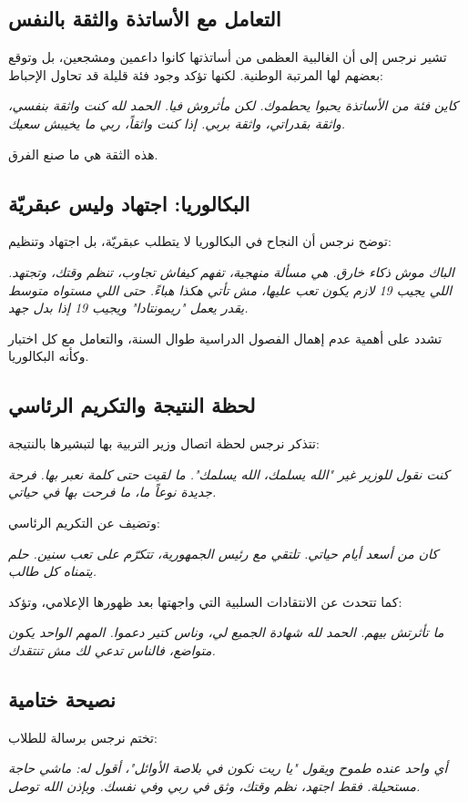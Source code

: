 \documentclass[12pt,a4paper]{book}
\newcommand{\quoteAr}[1]{%
	\begin{myquote}
		\itshape #1
	\end{myquote}
}
\begin{document}
	\subsection{التعامل مع الأساتذة والثقة بالنفس}
	تشير نرجس إلى أن الغالبية العظمى من أساتذتها كانوا داعمين ومشجعين، بل وتوقع بعضهم لها المرتبة الوطنية. لكنها تؤكد وجود فئة قليلة قد تحاول الإحباط:
	\quoteAr{كاين فئة من الأساتذة يحبوا يحطموك. لكن مأثروش فيا. الحمد لله كنت واثقة بنفسي، واثقة بقدراتي، واثقة بربي. إذا كنت واثقاً، ربي ما يخيبش سعيك.}
	هذه الثقة هي ما صنع الفرق.
	
	\subsection{البكالوريا: اجتهاد وليس عبقريّة}
	توضح نرجس أن النجاح في البكالوريا لا يتطلب عبقريّة، بل اجتهاد وتنظيم:
	\quoteAr{الباك موش ذكاء خارق. هي مسألة منهجية، تفهم كيفاش تجاوب، تنظم وقتك، وتجتهد. اللي يجيب 19 لازم يكون تعب عليها، مش تأتي هكذا هباءً. حتى اللي مستواه متوسط يقدر يعمل "ريمونتادا" ويجيب 19 إذا بدل جهد.}
	تشدد على أهمية عدم إهمال الفصول الدراسية طوال السنة، والتعامل مع كل اختبار وكأنه البكالوريا.
	
	\subsection{لحظة النتيجة والتكريم الرئاسي}
	تتذكر نرجس لحظة اتصال وزير التربية بها لتبشيرها بالنتيجة:
	\quoteAr{كنت نقول للوزير غير "الله يسلمك، الله يسلمك". ما لقيت حتى كلمة نعبر بها. فرحة جديدة نوعاً ما، ما فرحت بها في حياتي.}
	وتضيف عن التكريم الرئاسي:
	\quoteAr{كان من أسعد أيام حياتي. تلتقي مع رئيس الجمهورية، تتكرّم على تعب سنين. حلم يتمناه كل طالب.}
	كما تتحدث عن الانتقادات السلبية التي واجهتها بعد ظهورها الإعلامي، وتؤكد:
	\quoteAr{ما تأثرتش بيهم. الحمد لله شهادة الجميع لي، وناس كتير دعموا. المهم الواحد يكون متواضع، فالناس تدعي لك مش تنتقدك.}
	
	\subsection{نصيحة ختامية}
	تختم نرجس برسالة للطلاب:
	\quoteAr{أي واحد عنده طموح ويقول "يا ريت نكون في بلاصة الأوائل"، أقول له: ماشي حاجة مستحيلة. فقط اجتهد، نظم وقتك، وثق في ربي وفي نفسك. وبإذن الله توصل.}
	
\end{document}
